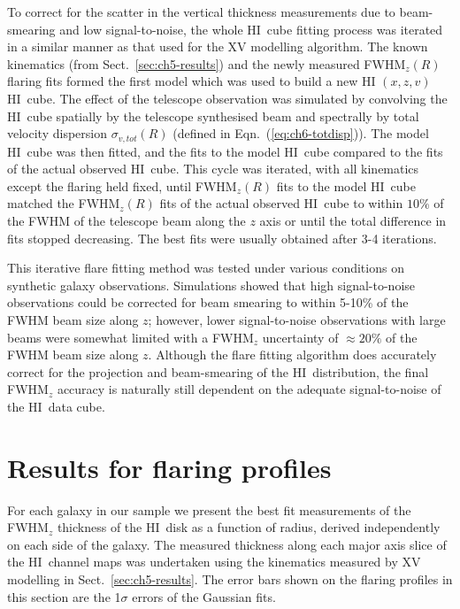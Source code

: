 \documentclass[traditabstract]{aa} %
\newcommand\HI{H{\small I}}
\begin{document}
To correct for the scatter in the vertical thickness measurements due
to beam-smearing and low signal-to-noise, the whole \HI\
cube fitting process was iterated in a similar manner as that used for
the XV modelling algorithm. The known kinematics (from
Sect.~\ref{sec:ch5-results}) and the newly measured FWHM$_z(R)$
flaring fits formed the first model which was used to build a new \HI
$(x,z,v)$ \HI\ cube. The effect of the telescope observation was
simulated by convolving the \HI\ cube spatially by the telescope
synthesised beam and spectrally by total velocity dispersion
$\sigma_{v,tot}(R)$ (defined in Eqn.~(\ref{eq:ch6-totdisp})). The model
\HI\ cube was then fitted, and the fits to the model \HI\
cube compared to the fits of the actual observed \HI\ 
cube.  This cycle was iterated, with all kinematics except the
flaring held fixed, until FWHM$_z(R)$ fits to the model \HI\
cube matched the FWHM$_z(R)$ fits of the actual observed \HI\ 
cube to within $10\%$ of the FWHM of the telescope beam along
the $z$ axis or until the total difference in fits stopped decreasing.
The best fits were usually obtained after 3-4 iterations.

This iterative flare fitting method was tested under various conditions on
synthetic galaxy observations. Simulations showed that high
signal-to-noise observations could be corrected for beam smearing to
within 5-10\% of the FWHM beam size along $z$; however, lower
signal-to-noise observations with large beams were somewhat limited
with a FWHM$_z$ uncertainty of $\approx 20\%$ of the FWHM beam size
along $z$. Although the flare fitting algorithm does accurately
correct for the projection and beam-smearing of the \HI\ distribution,
the final FWHM$_z$ accuracy is naturally still dependent on the
adequate signal-to-noise of the \HI\ data cube.


\section{Results for flaring profiles}
\label{sec:ch6-galaxies}

For each galaxy in our sample we present the best fit measurements of
the FWHM$_z$ thickness of the \HI\ disk as a function of radius,
derived independently on each side of the galaxy. The measured
thickness along each major axis slice of the \HI\ channel maps was
undertaken using the kinematics measured by XV modelling in
Sect.~\ref{sec:ch5-results}.
The error bars shown on the flaring profiles in this section are the
1$\sigma$ errors of the Gaussian fits. 
\end{document}
